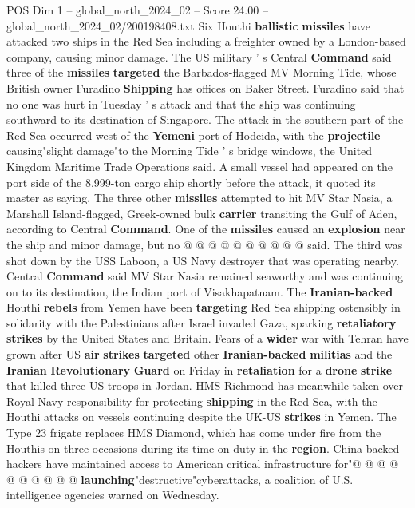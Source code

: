 \begin{textsample}{POS Dim 1 – global\_north\_2024\_02 – Score 24.00 – global\_north\_2024\_02/200198408.txt}  \label{ex:f1_pos_278}
Six Houthi \textbf{ballistic} \textbf{missiles} have attacked two ships in the Red Sea including a freighter owned by a London-based company, causing minor damage.
The US military ' s Central \textbf{Command} said three of the \textbf{missiles} \textbf{targeted} the Barbados-flagged MV Morning Tide, whose British owner Furadino \textbf{Shipping} has offices on Baker Street.
Furadino said that no one was hurt in Tuesday ' s attack and that the ship was continuing southward to its destination of Singapore.
The attack in the southern part of the Red Sea occurred west of the \textbf{Yemeni} port of Hodeida, with the \textbf{projectile} causing"slight damage"to the Morning Tide ' s bridge windows, the United Kingdom Maritime Trade Operations said.
A small vessel had appeared on the port side of the 8,999-ton cargo ship shortly before the attack, it quoted its master as saying.
The three other \textbf{missiles} attempted to hit MV Star Nasia, a Marshall Island-flagged, Greek-owned bulk \textbf{carrier} transiting the Gulf of Aden, according to Central \textbf{Command}.
One of the \textbf{missiles} caused an \textbf{explosion} near the ship and minor damage, but no @ @ @ @ @ @ @ @ @ @ said.
The third was shot down by the USS Laboon, a US Navy destroyer that was operating nearby.
Central \textbf{Command} said MV Star Nasia remained seaworthy and was continuing on to its destination, the Indian port of Visakhapatnam.
The \textbf{Iranian-backed} Houthi \textbf{rebels} from Yemen have been \textbf{targeting} Red Sea shipping ostensibly in solidarity with the Palestinians after Israel invaded Gaza, sparking \textbf{retaliatory} \textbf{strikes} by the United States and Britain.
Fears of a \textbf{wider} war with Tehran have grown after US \textbf{air} \textbf{strikes} \textbf{targeted} other \textbf{Iranian-backed} \textbf{militias} and the \textbf{Iranian} \textbf{Revolutionary} \textbf{Guard} on Friday in \textbf{retaliation} for a \textbf{drone} \textbf{strike} that killed three US troops in Jordan.
HMS Richmond has meanwhile taken over Royal Navy responsibility for protecting \textbf{shipping} in the Red Sea, with the Houthi attacks on vessels continuing despite the UK-US \textbf{strikes} in Yemen.
The Type 23 frigate replaces HMS Diamond, which has come under fire from the Houthis on three occasions during its time on duty in the \textbf{region}.
China-backed hackers have maintained access to American critical infrastructure for"@ @ @ @ @ @ @ @ @ @ \textbf{launching}"destructive"cyberattacks, a coalition of U.S. intelligence agencies warned on Wednesday.

\end{textsample}
